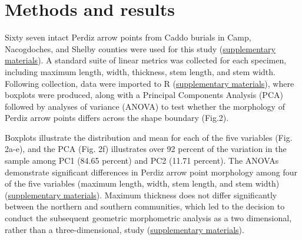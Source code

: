 \documentclass[smallextended]{svjour3}       %
\begin{document}
\hypertarget{methods-and-results}{%
\section{Methods and results}\label{methods-and-results}}

Sixty seven intact Perdiz arrow points from Caddo burials in Camp,
Nacogdoches, and Shelby counties were used for this study
(\href{https://seldenlab.github.io/perdiz3/}{supplementary materials}).
A standard suite of linear metrics was collected for each specimen,
including maximum length, width, thickness, stem length, and stem width.
Following collection, data were imported to R
(\href{https://seldenlab.github.io/perdiz3/}{supplementary materials}),
where boxplots were produced, along with a Principal Components Analysis
(PCA) followed by analyses of variance (ANOVA) to test whether the
morphology of Perdiz arrow points differs across the shape boundary
(Fig.2).

Boxplots illustrate the distribution and mean for each of the five
variables (Fig. 2a-e), and the PCA (Fig. 2f) illustrates over 92 percent
of the variation in the sample among PC1 (84.65 percent) and PC2 (11.71
percent). The ANOVAs demonstrate significant differences in Perdiz arrow
point morphology among four of the five variables (maximum length,
width, stem length, and stem width)
(\href{https://seldenlab.github.io/perdiz3/}{supplementary materials}).
Maximum thickness does not differ significantly between the northern and
southern communities, which led to the decision to conduct the
subsequent geometric morphometric analysis as a two dimensional, rather
than a three-dimensional, study
(\href{https://seldenlab.github.io/perdiz3/}{supplementary materials}).
\end{document}
